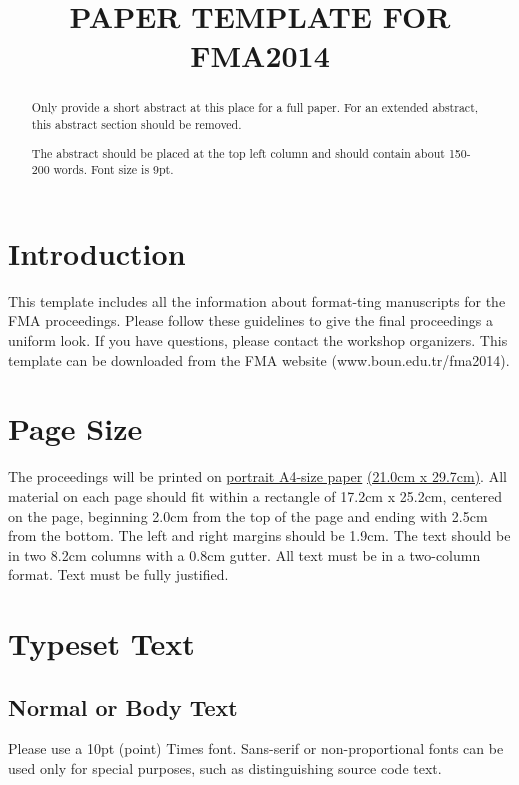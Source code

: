 \documentclass{article}
\title{PAPER TEMPLATE FOR FMA2014}
\begin{document}
%
\maketitle
%
\begin{abstract}
Only provide a short abstract at this place for a full paper. For an extended abstract, this abstract section should be removed.

The abstract should be placed at the top left column and should contain about 150-200 words. Font size is 9pt.
\end{abstract}
%
\section{Introduction}\label{sec:introduction}

This template includes all the information about format-ting manuscripts for the FMA proceedings. Please follow these guidelines to give the final proceedings a uniform look. If you have questions, please contact the workshop organizers. This template can be downloaded from the FMA website (www.boun.edu.tr/fma2014).

\section{Page Size}\label{sec:page_size}

The proceedings will be printed on 
 \underline{portrait A4-size paper} \underline{(21.0cm x 29.7cm)}. 
All material on each page should fit within a rectangle of 17.2cm x 25.2cm, 
centered on the page, beginning 2.0cm 
from the top of the page and ending with 2.5cm from the bottom. 
The left and right margins should be 1.9cm. 
The text should be in two 8.2cm columns with a 0.8cm gutter. 
All text must be in a two-column format. 
Text must be fully justified.

\section{Typeset Text}\label{sec:typeset_text}

\subsection{Normal or Body Text}\label{subsec:body}

Please use a 10pt (point) Times font. Sans-serif or non-proportional fonts 
can be used only for special purposes, such as distinguishing source code text.
\end{document}
